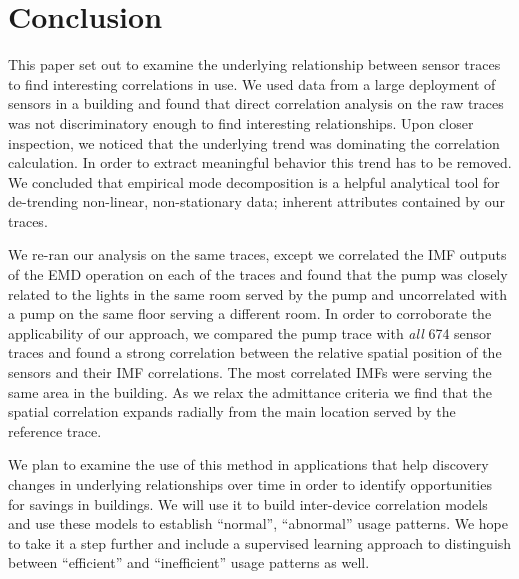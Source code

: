 



\section{Conclusion}





This paper set out to examine the underlying relationship between sensor traces to find interesting correlations
in use.  We used data from a large deployment of sensors in a building and found that direct correlation analysis on the raw
traces was not discriminatory enough to find interesting relationships.  Upon closer inspection, we noticed that
the underlying trend was dominating the correlation calculation.  In order to extract meaningful behavior this trend has
to be removed.  We concluded that empirical mode decomposition is a helpful analytical tool for de-trending 
non-linear, non-stationary data; inherent attributes contained by our traces.

We re-ran our analysis on the same traces, except we correlated the IMF outputs of the EMD operation on each of the traces and found that the pump was closely related to the lights in the same room served by the pump and
uncorrelated with a pump on the same floor serving a different room.  In order to corroborate the applicability
of our approach, we compared the pump trace with \emph{all} 674 sensor traces and found a strong correlation
between the relative spatial position of the sensors and their IMF correlations.  The most correlated IMFs were 
serving the same
area in the building.  As we relax the admittance criteria we find that the spatial correlation expands radially from
the main location served by the reference trace.

We plan to examine the use of this method in applications that help discovery changes in underlying relationships over time
in order to identify opportunities for savings in buildings.  We will use it to build inter-device correlation models
and use these models to establish ``normal'', ``abnormal'' usage patterns.  We hope to take it a step further and include a
supervised learning approach to distinguish between ``efficient'' and ``inefficient'' usage patterns as well.






